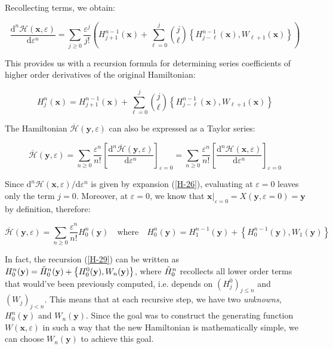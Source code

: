 Recollecting terms, we obtain:

\begin{equation}
    \label{H-26}
    \frac{\mathrm{d}^n\mathcal{H}(\mathbf{x},\varepsilon)}{\mathrm{d}\varepsilon^n}=\sum_{j\geq0}\frac{\varepsilon^j}{j!}\left(H^{n-1}_{j+1}(\mathbf{x})+\sum_{\ell=0}^j\binom{j}{\ell}\left\{H^{n-1}_{j-\ell}(\mathbf{x}),W_{\ell+1}(\mathbf{x})\right\}\right)
\end{equation}

This provides us with a recursion formula for determining series coefficients of higher order derivatives of the original Hamiltonian:

\begin{equation}
    H^n_j(\mathbf{x})=H^{n-1}_{j+1}(\mathbf{x})+\sum_{\ell=0}^j\binom{j}{\ell}\left\{H_{j-\ell}^{n-1}(\mathbf{x}),W_{\ell+1}(\mathbf{x})\right\}
\end{equation}

The Hamiltonian $\overline{\mathcal{H}}(\mathbf{y},\varepsilon)$ can also be expressed as a Taylor series:

\begin{equation}
    \overline{\mathcal{H}}(\mathbf{y},\varepsilon)=\sum_{n\geq0}\frac{\varepsilon^n}{n!}\left[\frac{\mathrm{d}^n\overline{\mathcal{H}}(\mathbf{y},\varepsilon)}{\mathrm{d}\varepsilon^n}\right]_{\varepsilon=0}=\sum_{n\geq0}\frac{\varepsilon^n}{n!}\left[\frac{\mathrm{d}^n\mathcal{H}(\mathbf{x},\varepsilon)}{\mathrm{d}\varepsilon^n}\right]_{\varepsilon=0}
\end{equation}

Since $\mathrm{d}^n\mathcal{H}(\mathbf{x},\varepsilon)/\mathrm{d}\varepsilon^n$ is given by expansion (\ref{H-26}), evaluating at $\varepsilon=0$ leaves only the term $j=0$. Moreover, at $\varepsilon=0$, we know that $\mathbf{x}\big|_{\varepsilon=0}=X(\mathbf{y},\varepsilon=0)=\mathbf{y}$ by definition, therefore:

\begin{equation}
    \label{H-29}
    \overline{\mathcal{H}}(\mathbf{y},\varepsilon)=\sum_{n\geq0}\frac{\varepsilon^n}{n!}{H}^n_0(\mathbf{y})\quad\text{where}\quad H^n_0(\mathbf{y})=H^{n-1}_1(\mathbf{y})+\left\{H^{n-1}_0(\mathbf{y}),W_1(\mathbf{y})\right\}
\end{equation}

In fact, the recursion (\ref{H-29}) can be written as $H^n_0(\mathbf{y})=\Tilde{H}^n_0(\mathbf{y})+\left\{H_0^0(\mathbf{y}),W_n(\mathbf{y})\right\}$, where $\Tilde{H}^n_0$ recollects all lower order terms that would've been previously computed, i.e. depends on $(H_j^0)_{j\leq n}$ and $(W_j)_{j<n}$. This means that at each recursive step, we have two \textit{unknowns}, $H^n_0(\mathbf{y})$ and $W_n(\mathbf{y})$. Since the goal was to construct the generating function $W(\mathbf{x},\varepsilon)$ in such a way that the new Hamiltonian is mathematically simple, we can choose $W_n(\mathbf{y})$ to achieve this goal.


